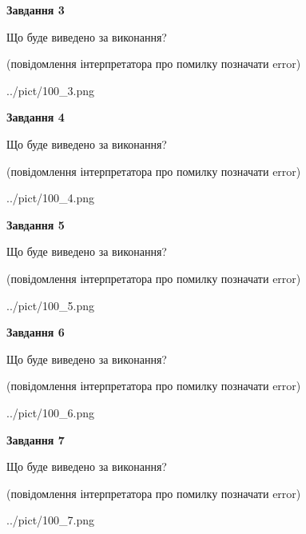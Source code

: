 \documentclass[12pt, ukrainian]{article}
\begin{document}
{\begin {large}
{\begin {center}\textbf{Завдання 3}\end {center}}\par
Що буде виведено за виконання?\par
 (повідомлення інтерпретатора про помилку позначати error)\par
\begin{center}
	{../pict/100_3.png}
\end{center}
\newpage

{\begin {center}\textbf{Завдання 4}\end {center}}\par
Що буде виведено за виконання?\par
 (повідомлення інтерпретатора про помилку позначати error)\par
\begin{center}
	{../pict/100_4.png}
\end{center}
\newpage

{\begin {center}\textbf{Завдання 5}\end {center}}\par
Що буде виведено за виконання?\par
 (повідомлення інтерпретатора про помилку позначати error)\par
\begin{center}
	{../pict/100_5.png}
\end{center}
\newpage

{\begin {center}\textbf{Завдання 6}\end {center}}\par
Що буде виведено за виконання?\par
 (повідомлення інтерпретатора про помилку позначати error)\par
\begin{center}
	{../pict/100_6.png}
\end{center}
\newpage

{\begin {center}\textbf{Завдання 7}\end {center}}\par
Що буде виведено за виконання?\par
 (повідомлення інтерпретатора про помилку позначати error)\par
\begin{center}
	{../pict/100_7.png}
\end{center}
\newpage


\end{large}}
\end{document}
